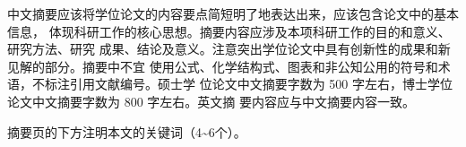 中文摘要应该将学位论文的内容要点简短明了地表达出来，应该包含论文中的基本信息，
体现科研工作的核心思想。摘要内容应涉及本项科研工作的目的和意义、研究方法、研究
成果、结论及意义。注意突出学位论文中具有创新性的成果和新见解的部分。摘要中不宜
使用公式、化学结构式、图表和非公知公用的符号和术语，不标注引用文献编号。硕士学
位论文中文摘要字数为 500 字左右，博士学位论文中文摘要字数为 800 字左右。英文摘
要内容应与中文摘要内容一致。

摘要页的下方注明本文的关键词（4\textasciitilde 6个）。

